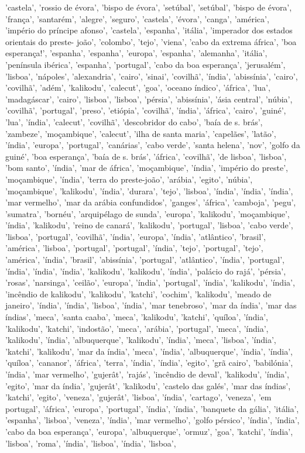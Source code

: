\documentclass{article}
\begin{document}
\begin{itemize}
'castela', 'rossio de évora', 'bispo de évora', 'setúbal', 'setúbal', 'bispo de évora', 'frança', 'santarém', 'alegre', 'seguro', 'castela', 'évora', 'canga', 'américa', 'império do príncipe afonso', 'castela', 'espanha', 'itália', 'imperador dos estados orientais do preste- joão', 'colombo', 'tejo', 'viena', 'cabo da extrema áfrica', 'boa esperança!', 'espanha', 'espanha', 'europa', 'espanha', 'alemanha', 'itália', 'península ibérica', 'espanha', 'portugal', 'cabo da boa esperança', 'jerusalém', 'lisboa', 'nápoles', 'alexandria', 'cairo', 'sinai', 'covilhã', 'índia', 'abissínia', 'cairo', 'covilhã', 'adém', 'kalikodu', 'calecut', 'goa', 'oceano índico', 'áfrica', 'lua', 'madagáscar', 'cairo', 'lisboa', 'lisboa', 'pérsia', 'abissínia', 'ásia central', 'núbia', 'covilhã', 'portugal', 'preso', 'etiópia', 'covilhã', 'índia', 'áfrica', 'cairo', 'guiné', 'lua', 'índia', 'calecut', 'covilhã', 'descobridor do cabo', 'baía de s. brás', 'zambeze', 'moçambique', 'calecut', 'ilha de santa maria', 'capelães', 'latão', 'índia', 'europa', 'portugal', 'canárias', 'cabo verde', 'santa helena', 'nov', 'golfo da guiné', 'boa esperança', 'baía de s. brás', 'áfrica', 'covilhã', 'de lisboa', 'lisboa', 'bom santo', 'índia', 'mar de áfrica', 'moçambique', 'índia', 'império do preste', 'moçambique', 'índia', 'terra do preste-joão', 'arábia', 'egito', 'núbia', 'moçambique', 'kalikodu', 'índia', 'durara', 'tejo', 'lisboa', 'índia', 'índia', 'índia', 'mar vermelho', 'mar da arábia confundidos', 'ganges', 'áfrica', 'camboja', 'pegu', 'sumatra', 'bornéu', 'arquipélago de sunda', 'europa', 'kalikodu', 'moçambique', 'índia', 'kalikodu', 'reino de canará', 'kalikodu', 'portugal', 'lisboa', 'cabo verde', 'lisboa', 'portugal', 'covilhã', 'índia', 'europa', 'índia', 'atlântico', 'brasil', 'américa', 'lisboa', 'portugal', 'portugal', 'índia', 'tejo', 'portugal', 'tejo', 'américa', 'índia', 'brasil', 'abissínia', 'portugal', 'atlântico', 'índia', 'portugal', 'índia', 'índia', 'índia', 'kalikodu', 'kalikodu', 'índia', 'palácio do rajá', 'pérsia', 'rosas', 'narsinga', 'ceilão', 'europa', 'índia', 'portugal', 'índia', 'kalikodu', 'índia', 'incêndio de kalikodu', 'kalikodu', 'katchi', 'cochim', 'kalikodu', 'meado de janeiro', 'índia', 'índia', 'lisboa', 'índia', 'mar tenebroso', 'mar da índia', 'mar das índias', 'meca', 'santa caaba', 'meca', 'kalikodu', 'katchi', 'quíloa', 'índia', 'kalikodu', 'katchi', 'indostão', 'meca', 'arábia', 'portugal', 'meca', 'índia', 'kalikodu', 'índia', 'albuquerque', 'kalikodu', 'índia', 'meca', 'lisboa', 'índia', 'katchi', 'kalikodu', 'mar da índia', 'meca', 'índia', 'albuquerque', 'índia', 'índia', 'quíloa', 'cananor', 'áfrica', 'terra', 'índia', 'índia', 'egito', 'grã cairo', 'babilónia', 'índia', 'mar vermelho', 'gujerât', 'rajás', 'incêndio de deval', 'kalikodu', 'índia', 'egito', 'mar da índia', 'gujerât', 'kalikodu', 'castelo das galés', 'mar das índias', 'katchi', 'egito', 'veneza', 'gujerât', 'lisboa', 'índia', 'cartago', 'veneza', 'em portugal', 'áfrica', 'europa', 'portugal', 'índia', 'índia', 'banquete da gália', 'itália', 'espanha', 'lisboa', 'veneza', 'índia', 'mar vermelho', 'golfo pérsico', 'índia', 'índia', 'cabo da boa esperança', 'europa', 'albuquerque', 'ormuz', 'goa', 'katchi', 'índia', 'lisboa', 'roma', 'índia', 'lisboa', 'índia', 'lisboa', 
\end{itemize}
\end{document}
